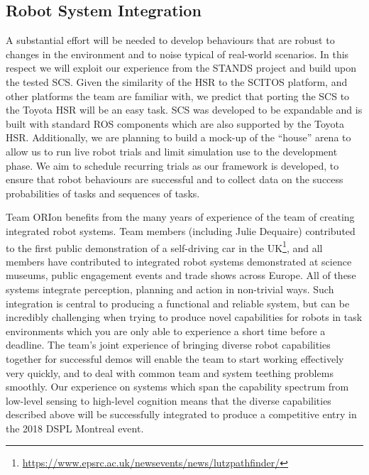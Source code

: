 \documentclass[runningheads,a4paper]{llncs}
\newcommand{\teamori}{Team ORIon}
\begin{document}
\subsection{Robot System Integration}

A substantial effort will be needed to develop behaviours that are robust to
changes in the environment and to noise typical of real-world scenarios. In this
respect we will exploit our experience from the STANDS project 
\cite{strands@ram} and build upon the tested SCS. 
Given the similarity of the HSR to the SCITOS platform, and other platforms the team are familiar with, %
we predict that porting the
SCS to the Toyota HSR will be an easy task. SCS was developed to be 
expandable and is built with standard ROS components which are also supported by the
Toyota HSR. Additionally, we are planning to build a mock-up of the ``house''
arena to
allow us to run live robot trials and limit simulation use to the development
phase. We aim to schedule recurring trials as our framework is developed, to
ensure that robot behaviours are successful and to collect data on the 
success probabilities of tasks and sequences of tasks.

\teamori{} benefits from the many years of experience of the team of creating integrated robot systems. Team members (including Julie Dequaire) contributed to the first public demonstration of a self-driving car in the UK\footnote{\url{https://www.epsrc.ac.uk/newsevents/news/lutzpathfinder/}}, and all members have contributed to integrated robot systems demonstrated at science museums, public engagement events and trade shows across Europe. All of these systems integrate perception, planning and action in non-trivial ways. Such integration is central to producing a functional and reliable system, but can be incredibly challenging when trying to produce novel capabilities for robots in task environments which you are only able to experience a short time before a deadline. The team's joint experience of bringing diverse robot capabilities together for successful demos will enable the team to start working effectively very quickly, and to deal with common team and system teething problems smoothly. Our experience on systems which span the capability spectrum from low-level sensing to high-level cognition means that the diverse capabilities described above will be successfully integrated to produce a competitive entry in the 2018 DSPL Montreal event.
\end{document}

